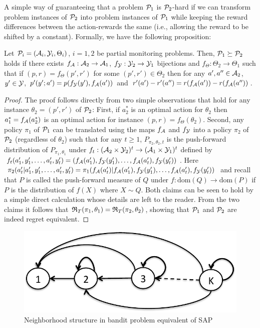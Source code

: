 A simple way of guaranteeing that a problem $\P_1$ is $\P_2$-hard if we can transform problem instances of $\P_2$ into 
problem instances of $\P_1$ while keeping the reward differences between the action-rewards the same (i.e., allowing the reward to be shifted by a constant).
Formally, we have the following proposition:
\begin{prop}
Let $\P_i = (\A_i,\Y_i,\Theta_i)$, $i=1,2$ be partial monitoring problems.
Then, $\P_1\succeq \P_2$ holds if there exists $f_{\A}:\A_2\to \A_1$, $f_{\Y}: \Y_2 \to \Y_1$ bijections and $f_{\Theta}:\Theta_2\to \Theta_1$ such that if $(p,r) = f_{\Theta}(p',r')$ for some $(p',r')\in \Theta_2$ then
for any $a',a''\in \A_2$, $y'\in \Y$,
$p'(y';a') = p(f_\Y(y'),f_\A(a'))$ and $r'(a')-r'(a'') = r(f_\A(a')) - r(f_\A(a''))$.
\end{prop}
\begin{proof}
The proof follows directly from two simple observations 
that hold for any instance $\theta_2 = (p',r')$ of $\P_2$: 
First, if $a_2^*$ is an optimal action for $\theta_2$
then $a_1^*=f_\A(a_2^*)$ is an optimal action for instance $(p,r) = f_\Theta(\theta_2)$.
Second, any policy $\pi_1$ of $\P_1$ can be translated using the maps $f_\A$ and $f_\Y$ into a policy $\pi_2$ of $\P_2$ (regardless of $\theta_2$) such that
for any $t\ge 1$,
$P_{\pi_2,\theta_2,t}$ is the push-forward distribution 
of $P_{\pi_1,\theta_1}$ under $f_t:(\A_2\times \Y_2)^t \to (\A_1\times \Y_1)^t$
defined by $f_t(a_1',y_1',\dots,a_t',y_t') = (f_\A(a_1'),f_\Y(y_1'),\dots,f_\A(a_t'),f_\Y(y_t'))$. 
Here $\pi_2(a'_t|a_1',y_1',\dots,a_t',y_t') = \pi_1( f_\A(a_t')| f_\A(a_1'),f_\Y(y_1'),\dots,f_\A(a_t'),f_\Y(y_t'))$ and recall that $P$ is called the push-forward measure of $Q$ under $f:\mathrm{dom}(Q)\to \mathrm{dom}(P)$ if $P$ is the distribution of $f(X)$ where $X\sim Q$.
Both claims can be seen to hold by a simple direct calculation whose details are left 
to the reader.
From the two claims it follows that $\Regret_T(\pi_1,\theta_1)
= \Regret_T(\pi_2,\theta_2)$, showing that $\P_1$ and $\P_2$ are indeed
regret equivalent.
\end{proof}

\fi



\begin{figure}
	\centering
	\vspace{-.5cm}
	\includegraphics[scale=.4]{../Figures/SideInfoGraph.pdf}
	\caption{ Neighborhood structure in bandit problem equivalent of SAP}
	\label{fig:SideObservationGraph]}
	\vspace{-.2cm}
\end{figure} 

